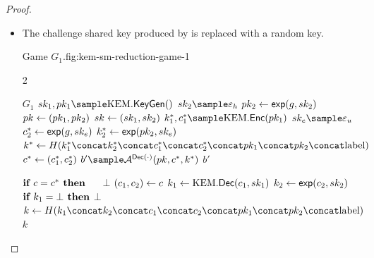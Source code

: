 \begin{proof}
    \begin{itemize}
    \item[\textbf{Game 1}]
        The challenge shared key produced by \kem is replaced with a random key.
        \begin{gamefigure}{Game $G_1$.}{fig:kem-sm-reduction-game-1}
            \begin{games}{2}
                \begin{gameenv}{\game $G_1$}
                    \State $\sk_1, \pk_1 \sample \kem.\keygen()$
                    \State $\sk_2 \sample \honestexponent$
                    \State $pk_2 \leftarrow \textsf{exp}(g, sk_2)$
                    \State $pk \leftarrow (pk_1, pk_2)$
                    \State $sk \leftarrow (sk_1, sk_2)$
                    \State $k^*_1, c^*_1 \sample \kem.\enc(\pk_1)$
                    \State $\sk_e \sample \exponent$
                    \State $c^*_2 \leftarrow \textsf{exp}(g, sk_e)$
                    \State $k^*_2 \leftarrow \textsf{exp}(pk_2, sk_e)$
                    \State {}
                    \State $k^* \assign H(\hashinputchallenges)$
                    \State $c^* \leftarrow (c_1^*, c_2^*)$
                    \State $b' \sample \adversary{A}^{\dec(\cdot)}(\pk, c^*, k^*)$
                    \State \Return $b'$
                \end{gameenv}

                \gamebreak

                \begin{gameenv}{\oracledec}
                    \State $\textbf{if } c = c^* \textbf{ then}$
                    \State $\quad$ \Return $\bot$
                    \State $(c_1, c_2) \leftarrow c$
                    \State $k_1 \leftarrow \text{KEM}.\textsf{Dec}(c_1, sk_1)$
                    \State $k_2 \leftarrow \textsf{exp}(c_2, sk_2)$
                    \State $\textbf{if } k_1 = \bot \textbf{ then}$
                    \State \quad \Return $\bot$
                    \State {}
                    \State {}
                    \State $k \assign H(\hashinput)$
                    \State \Return $k$
                \end{gameenv}
            \end{games}
        \end{gamefigure}


\end{itemize}
\end{proof}
